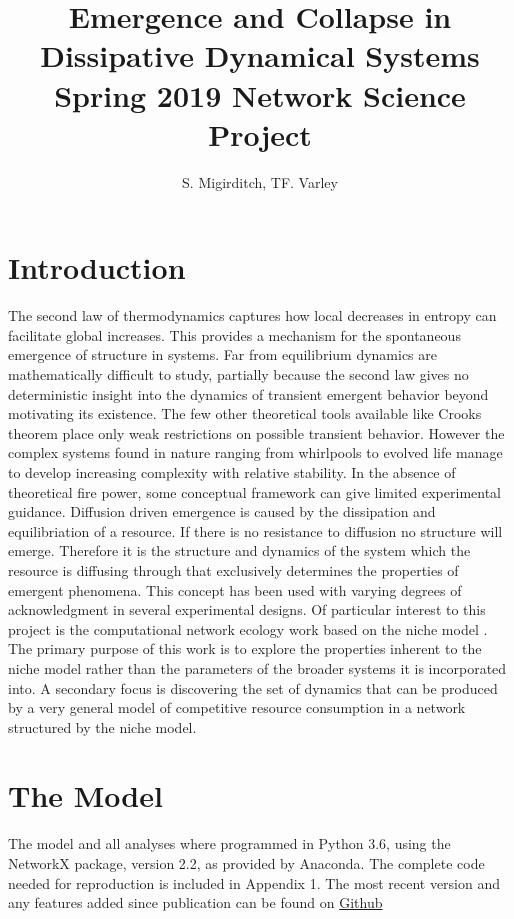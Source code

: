 \documentclass{paper}
\title{Emergence and Collapse in Dissipative Dynamical Systems \\ \textnormal{Spring 2019 Network Science Project}}
\author{S. Migirditch, TF. Varley}
\begin{document}
	\maketitle
	
	\section{Introduction}
	The second law of thermodynamics captures how local decreases in entropy can facilitate global increases. This provides a mechanism for the spontaneous emergence of structure in systems. Far from equilibrium dynamics are mathematically difficult to study, partially because the second law gives no deterministic insight into the dynamics of transient emergent behavior beyond motivating its existence. The few other theoretical tools available like Crooks theorem \cite{crooks_entropy_1999} place only weak restrictions on possible transient behavior.
	However the complex systems found in nature ranging from whirlpools to evolved life manage to develop increasing complexity with relative stability. In the absence of theoretical fire power, some conceptual framework can give limited experimental guidance. Diffusion driven emergence is caused by the dissipation and equilibriation of a resource. If there is no resistance to diffusion no structure will emerge. Therefore it is the structure and dynamics of the system which the resource is diffusing through that exclusively determines the properties of emergent phenomena\cite{strogatz_exploring_2001, gates_control_2016}. This concept has been used with varying degrees of acknowledgment in several experimental designs. Of particular interest to this project is the computational network ecology work based on the niche model \cite{Williams2000}. The primary purpose of this work is to explore the properties inherent to the niche model rather than the parameters of the broader systems it is incorporated into. A secondary focus is discovering the set of dynamics that can be produced by a very general model of competitive resource consumption in a network structured by the niche model. 
	\section{The Model}
	
	The model and all analyses where programmed in Python 3.6, using the NetworkX package, version 2.2, as provided by Anaconda. The complete code needed for reproduction is included in Appendix 1. The most recent version and any features added since publication can be found on \href{https://github.com/Migirditchsv/DissapativeNetworks.git}{Github}
	
\end{document}
